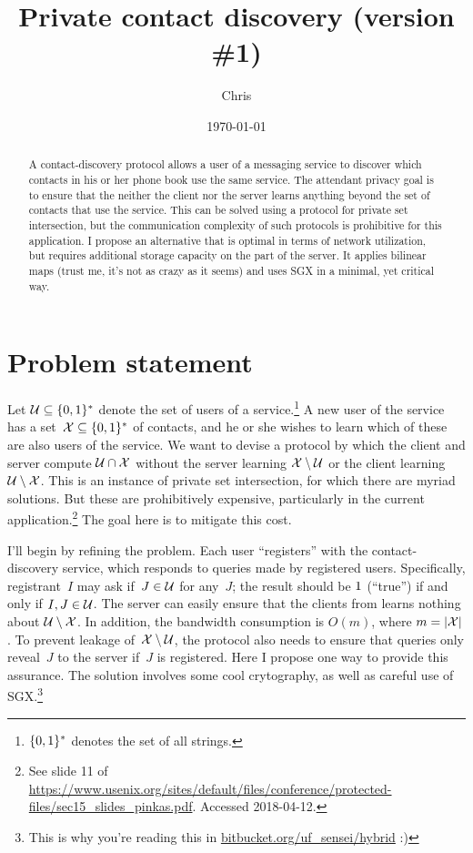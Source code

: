 \documentclass{build/llncs}
\date{\today}
\title{Private contact discovery ({\color{thegray}version \#1})}
\author{Chris}
\institute{}
\begin{document}
\maketitle

\begin{abstract}
  A contact-discovery protocol allows a user of a messaging service to discover
  which contacts in his or her phone book use the same service. The attendant
  privacy goal is to ensure that the neither the client nor the server learns
  anything beyond the set of contacts that use the service.
  This can be solved using a protocol for private set intersection, but the
  communication complexity of such protocols is prohibitive for this
  application.
  I propose an alternative that is optimal in terms of network utilization,
  but requires additional storage capacity on the part of the server. It applies
  bilinear maps (trust me, it's not as crazy as it seems) and uses SGX in a
  minimal, yet critical way.
\end{abstract}

\section*{Problem statement}

Let $\mathcal{U} \subseteq \{0,1\}^*$ denote the set of users of a
service.\footnote{$\{0,1\}^*$ denotes the set of all strings.}
%
A new user of the service has a set~$\mathcal{X} \subseteq \{0,1\}^*$ of contacts, and he
or she wishes to learn which of these are also users of the service.
%
We want to devise a protocol by which the client and server compute $\mathcal{U}
\cap \mathcal{X}$ without the server learning $\mathcal{X} \setminus \mathcal{U}$ or the client
learning $\mathcal{U} \setminus \mathcal{X}$.
%
This is an instance of private set intersection, for which there are myriad
solutions. But these are prohibitively expensive, particularly in the current
application.\footnote{See slide 11 of
\url{https://www.usenix.org/sites/default/files/conference/protected-files/sec15_slides_pinkas.pdf}.
Accessed 2018-04-12.}
%
The goal here is to mitigate this cost.

I'll begin by refining the problem. Each user ``registers'' with the
contact-discovery service, which responds to queries made by registered users.
%
Specifically, registrant~$I$ may ask if~$J\in\mathcal{U}$ for any~$J$; the result should
be $1$ (``true'') if and only if $I, J \in \mathcal{U}$.
%
The server can easily ensure that the clients from learns nothing about $\mathcal{U}
\setminus \mathcal{X}$. In addition, the bandwidth consumption is $O(m)$, where $m=|\mathcal{X}|$.
%
To prevent leakage of~$\mathcal{X} \setminus \mathcal{U}$, the protocol also needs to ensure that
queries only reveal~$J$ to the server if~$J$ is registered. Here I propose one
way to provide this assurance. The solution involves some cool crytography, as
well as careful use of SGX.\footnote{This is why you're reading this in
\url{bitbucket.org/uf_sensei/hybrid} :)}
\end{document}
